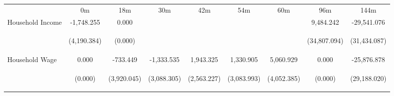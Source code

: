 \begin{tabular}{lcccccccc}
\hline \noalign{\smallskip} & 0m & 18m & 30m & 42m & 54m & 60m & 96m & 144m\\
\noalign{\smallskip}\hline \noalign{\smallskip}Household Income & -1,748.255 & 0.000 &  &  &  &  & 9,484.242 & -29,541.076\\
 & \begin{footnotesize}(4,190.384)\end{footnotesize} & \begin{footnotesize}(0.000)\end{footnotesize} & \begin{footnotesize}\end{footnotesize} & \begin{footnotesize}\end{footnotesize} & \begin{footnotesize}\end{footnotesize} & \begin{footnotesize}\end{footnotesize} & \begin{footnotesize}(34,807.094)\end{footnotesize} & \begin{footnotesize}(31,434.087)\end{footnotesize}\\
\noalign{\smallskip}Household Wage & 0.000 & -733.449 & -1,333.535 & 1,943.325 & 1,330.905 & 5,060.929 & 0.000 & -25,876.878\\
 & \begin{footnotesize}(0.000)\end{footnotesize} & \begin{footnotesize}(3,920.045)\end{footnotesize} & \begin{footnotesize}(3,088.305)\end{footnotesize} & \begin{footnotesize}(2,563.227)\end{footnotesize} & \begin{footnotesize}(3,083.993)\end{footnotesize} & \begin{footnotesize}(4,052.385)\end{footnotesize} & \begin{footnotesize}(0.000)\end{footnotesize} & \begin{footnotesize}(29,188.020)\end{footnotesize}\\

\end{tabular}
